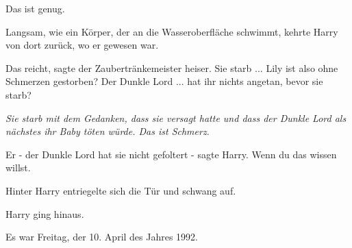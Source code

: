 \glqq{}Das ist genug.\grqq{}

Langsam, wie ein Körper, der an die Wasseroberfläche schwimmt, kehrte Harry von
dort zurück, wo er gewesen war.

\glqq{}Das reicht\grqq{}, sagte der Zaubertränkemeister heiser. \glqq{}Sie
starb ... Lily ist also ohne Schmerzen gestorben? Der Dunkle Lord ... hat ihr
nichts angetan, bevor sie starb?\grqq{}

\emph{Sie starb mit dem Gedanken, dass sie versagt hatte und dass der Dunkle
Lord als nächstes ihr Baby töten würde. Das ist Schmerz.}

\glqq{}Er - der Dunkle Lord hat sie nicht gefoltert -\grqq{} sagte Harry. \glqq{}
Wenn du das wissen willst.\grqq{}

Hinter Harry entriegelte sich die Tür und schwang auf.

Harry ging hinaus.

Es war Freitag, der 10. April des Jahres 1992.

